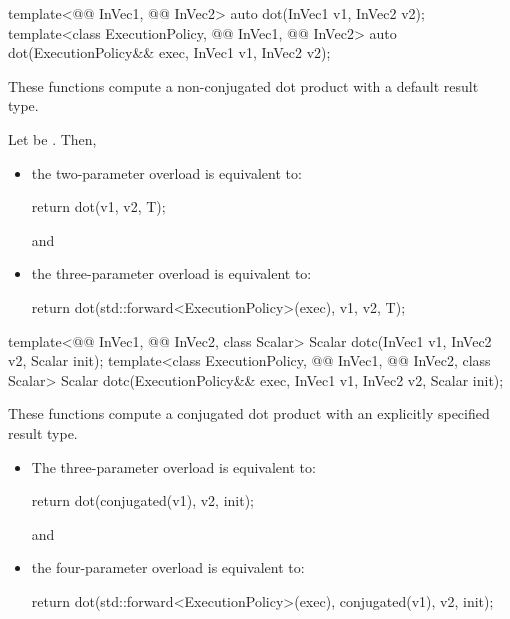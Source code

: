 %
\begin{itemdecl}
  template<@@ InVec1, @@ InVec2>
    auto dot(InVec1 v1, InVec2 v2);
  template<class ExecutionPolicy, @@ InVec1, @@ InVec2>
    auto dot(ExecutionPolicy&& exec,
             InVec1 v1, InVec2 v2);
\end{itemdecl}

\begin{itemdescr}
\pnum
These functions compute a non-conjugated dot product with a default result type.

\pnum
\effects
Let  be
.
Then,
\begin{itemize}
\item
the two-parameter overload is equivalent to:
\begin{codeblock}
return dot(v1, v2, T{});
\end{codeblock}
and
\item
the three-parameter overload is equivalent to:
\begin{codeblock}
return dot(std::forward<ExecutionPolicy>(exec), v1, v2, T{});
\end{codeblock}
\end{itemize}
\end{itemdescr}

%
\begin{itemdecl}
template<@@ InVec1, @@ InVec2, class Scalar>
  Scalar dotc(InVec1 v1, InVec2 v2, Scalar init);
template<class ExecutionPolicy, @@ InVec1, @@ InVec2, class Scalar>
  Scalar dotc(ExecutionPolicy&& exec,
              InVec1 v1, InVec2 v2, Scalar init);
\end{itemdecl}

\begin{itemdescr}

\pnum
These functions compute a conjugated dot product
with an explicitly specified result type.

\pnum
\effects
\begin{itemize}
\item
The three-parameter overload is equivalent to:
\begin{codeblock}
return dot(conjugated(v1), v2, init);
\end{codeblock}
and
\item
the four-parameter overload is equivalent to:
\begin{codeblock}
return dot(std::forward<ExecutionPolicy>(exec), conjugated(v1), v2, init);
\end{codeblock}
\end{itemize}
\end{itemdescr}

